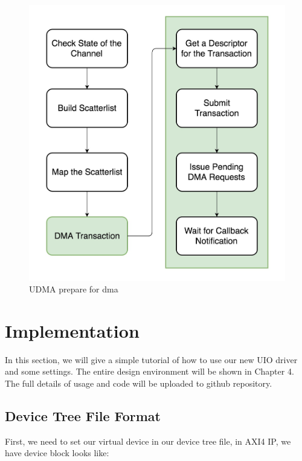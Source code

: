 \begin{figure}[p]
  \centering
  \includegraphics[scale=0.3]{images/udma_prepare_dma.jpg}
  \caption[Udma Prepare for DMA]{UDMA prepare for dma}
  \label{fig:Udma Prepare for DMA}
\end{figure}
\newpage


\section{Implementation}
\label{sec:Implementation}
In this section, we will give a simple tutorial of how to use our new UIO driver and some settings. The entire design environment will be shown in Chapter 4. The full details of usage and code will be uploaded to github repository\cite{mainwork}. 


\subsection{Device Tree File Format}
\label{subsec:Device Tree}
First, we need to set our virtual device in our device tree file, in AXI4 IP, we have device block looks like:

